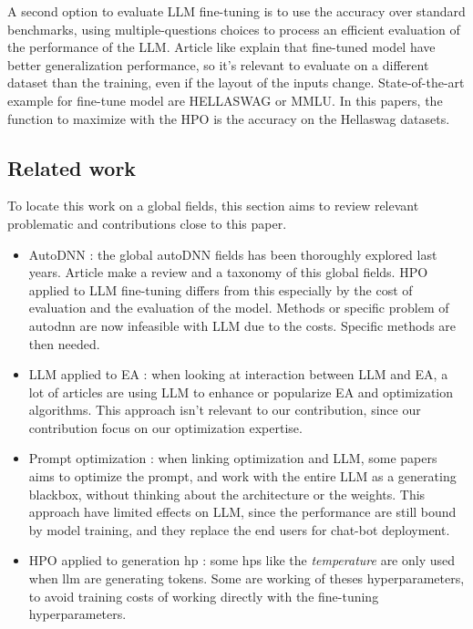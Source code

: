 A second option to evaluate LLM fine-tuning is to use the accuracy over standard benchmarks, using multiple-questions choices to process an efficient evaluation of the performance of the LLM. Article like \cite{wei_finetuned_2022} explain that fine-tuned model have better generalization performance, so it's relevant to evaluate on a different dataset than the training, even if the layout of the inputs change. State-of-the-art example for fine-tune model are HELLASWAG\cite{zellers_hellaswag_2019} or MMLU\cite{hendryckstest2021,hendrycks2021ethics}. In this papers, the function to maximize with the HPO is the accuracy on the Hellaswag datasets.



\subsection{Related work}
\label{sec:related}
To locate this work on a global fields, this section aims to review relevant problematic and contributions close to this paper. 

\begin{itemize}
    \item AutoDNN : the global autoDNN fields has been thoroughly explored last years. Article \cite{talbi_automated_2021} make a review and a taxonomy of this global fields. HPO applied to LLM fine-tuning differs from this especially by the cost of evaluation and the evaluation of the model. Methods or specific problem of \acrshort{autodnn} are now infeasible with LLM due to the costs. Specific methods are then needed.
    \item LLM applied to EA : when looking at interaction between LLM and EA, a lot of articles \cite{liu_large_2024,cai_exploring_2024,brahmachary_large_2024} are using LLM to enhance or popularize EA and optimization algorithms. This approach isn't relevant to our contribution, since our contribution focus on our optimization expertise. 
    \item Prompt optimization : when linking optimization and LLM, some papers \cite{diao_black-box_2023,xu_gps_2022} aims to optimize the prompt, and work with the entire LLM as a generating blackbox, without thinking about the architecture or the weights. This approach have limited effects on LLM, since the performance are still bound by model training, and they replace the end users for chat-bot deployment. 
    \item HPO applied to generation \gls{hp} : some \glspl{hp} like the \textit{temperature} are only used when \acrshort{llm} are generating tokens. Some are working of theses hyperparameters, to avoid training costs of working directly with the fine-tuning hyperparameters.  
\end{itemize}



